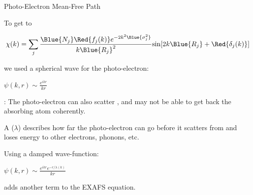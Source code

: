 
\begin{slide}{Photo-Electron Mean-Free Path}



\begin{cenpage}{100mm}

  To get to

    \[ \chi(k) = \sum_j {\frac{{\Blue{N_j}} {\Red{f_j(k)}}
        e^{-2k^2{\Blue{\sigma_j^2}}}}{k{\Blue{R_j}}^2}
      {\sin[{2k{\Blue{R_j}} + {\Red{\delta_j(k)}}] }}} \]

 we used a spherical wave for the photo-electron:

  \begin{cenpage}{45mm}
    {$\displaystyle        \psi(k,r) \sim  \frac{{e^{ikr}}}{kr}  $}
  \end{cenpage}


    {}:  The photo-electron can also scatter {}, and may
    not be able to get back the absorbing atom coherently.

 \vmm

 A {} ($\lambda$) describes how far the
 photo-electron can go before it scatters from and loses energy to other
 electrons, phonons, etc.

\vmm\vmm  Using a damped wave-function:

\begin{cenpage}{40mm}
  {$\displaystyle \psi(k,r) \sim \frac{e^{ikr} e^{-r/\lambda(k)}}{kr} $ }
\end{cenpage}

adds another term to the EXAFS equation.
\end{cenpage}
\end{slide}


